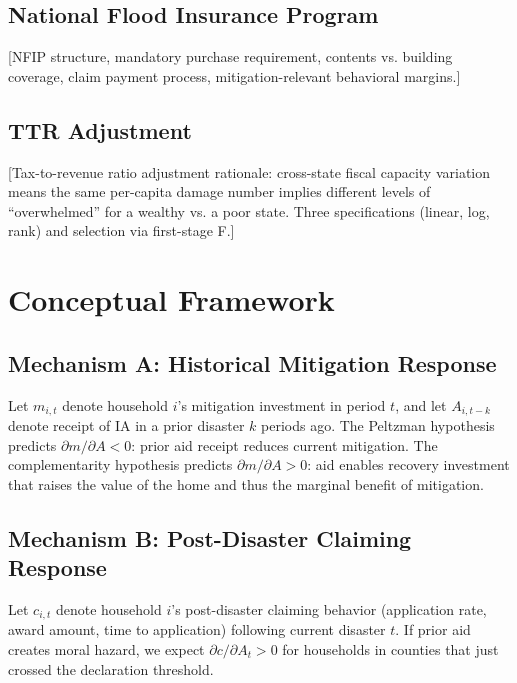 \documentclass[12pt]{article}
\newcommand{\IA}{\textrm{IA}}
\begin{document}
\subsection{National Flood Insurance Program}

[NFIP structure, mandatory purchase requirement, contents vs. building coverage,
claim payment process, mitigation-relevant behavioral margins.]

\subsection{TTR Adjustment}
\label{sec:ttr}

[Tax-to-revenue ratio adjustment rationale: cross-state fiscal capacity variation
means the same per-capita damage number implies different levels of ``overwhelmed''
for a wealthy vs. a poor state. Three specifications (linear, log, rank) and
selection via first-stage F.]

\section{Conceptual Framework}
\label{sec:framework}

\subsection{Mechanism A: Historical Mitigation Response}

Let $m_{i,t}$ denote household $i$'s mitigation investment in period $t$,
and let $A_{i,t-k}$ denote receipt of \IA{} in a prior disaster $k$ periods ago.
The Peltzman hypothesis predicts $\partial m / \partial A < 0$: prior aid receipt
reduces current mitigation.
The complementarity hypothesis \citep{andor2020} predicts $\partial m / \partial A > 0$:
aid enables recovery investment that raises the value of the home and thus the
marginal benefit of mitigation.

\subsection{Mechanism B: Post-Disaster Claiming Response}

Let $c_{i,t}$ denote household $i$'s post-disaster claiming behavior (application
rate, award amount, time to application) following current disaster $t$.
If prior aid creates moral hazard, we expect $\partial c / \partial A_{t} > 0$
for households in counties that just crossed the declaration threshold.
\end{document}
